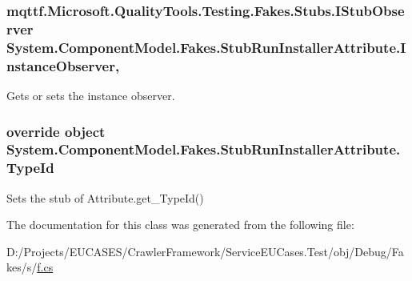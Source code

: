 \hypertarget{class_system_1_1_component_model_1_1_fakes_1_1_stub_run_installer_attribute_a6c416666f27e9a0e6ad36c99a49f266a}{
\subsubsection[{Instance\-Observer}]{\setlength{\rightskip}{0pt plus 5cm}mqttf.\-Microsoft.\-Quality\-Tools.\-Testing.\-Fakes.\-Stubs.\-I\-Stub\-Observer System.\-Component\-Model.\-Fakes.\-Stub\-Run\-Installer\-Attribute.\-Instance\-Observer\hspace{0.3cm}{\ttfamily [get]}, {\ttfamily [set]}}}\label{class_system_1_1_component_model_1_1_fakes_1_1_stub_run_installer_attribute_a6c416666f27e9a0e6ad36c99a49f266a}


Gets or sets the instance observer.

\hypertarget{class_system_1_1_component_model_1_1_fakes_1_1_stub_run_installer_attribute_ad628fcba0a2feee5c1875c7fe01aded8}{
\subsubsection[{Type\-Id}]{\setlength{\rightskip}{0pt plus 5cm}override object System.\-Component\-Model.\-Fakes.\-Stub\-Run\-Installer\-Attribute.\-Type\-Id\hspace{0.3cm}{\ttfamily [get]}}}\label{class_system_1_1_component_model_1_1_fakes_1_1_stub_run_installer_attribute_ad628fcba0a2feee5c1875c7fe01aded8}


Sets the stub of Attribute.\-get\-\_\-\-Type\-Id()



The documentation for this class was generated from the following file\-:\begin{DoxyCompactItemize}
\item 
D\-:/\-Projects/\-E\-U\-C\-A\-S\-E\-S/\-Crawler\-Framework/\-Service\-E\-U\-Cases.\-Test/obj/\-Debug/\-Fakes/s/\hyperlink{s_2f_8cs}{f.\-cs}\end{DoxyCompactItemize}
